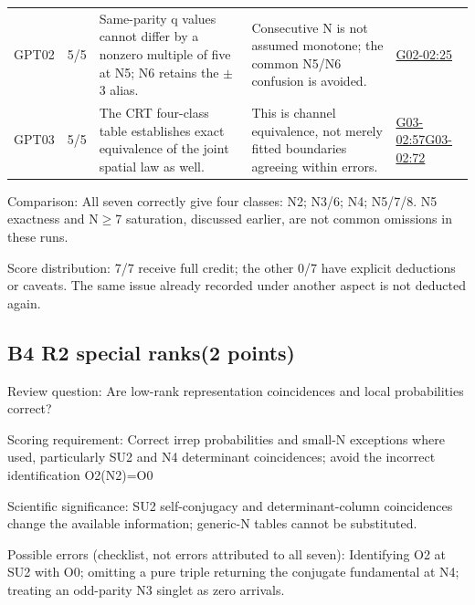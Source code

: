 \documentclass[11pt,a4paper]{article}
\begin{document}
{\begin{longtable}
{}GPT02 & 5/\allowbreak{}5 & Same-parity q values cannot differ by a nonzero multiple of five at N5; N6 retains the \ensuremath{\pm}3 alias. & Consecutive N is not assumed monotone; the common N5/\allowbreak{}N6 confusion is avoided. & \hyperref[src:G02-02]{G02-02:25}\tabularnewline
{}GPT03 & 5/\allowbreak{}5 & The CRT four-class table establishes exact equivalence of the joint spatial law as well. & This is channel equivalence,\allowbreak{} not merely fitted boundaries agreeing within errors. & \hyperref[src:G03-02]{G03-02:57}\newline \hyperref[src:G03-02]{G03-02:72}\tabularnewline
\bottomrule
\end{longtable}
}
Comparison: All seven correctly give four classes: N2; N3/\allowbreak{}6; N4; N5/\allowbreak{}7/\allowbreak{}8. N5 exactness and N\ensuremath{\geq}7 saturation,\allowbreak{} discussed earlier,\allowbreak{} are not common omissions in these runs.

Score distribution: 7/\allowbreak{}7 receive full credit; the other 0/\allowbreak{}7 have explicit deductions or caveats. The same issue already recorded under another aspect is not deducted again.

\clearpage
\subsection{B4 R2 special ranks(2 points)}
\label{aspect:B4}
Review question: Are low-rank representation coincidences and local probabilities correct?

Scoring requirement: Correct irrep probabilities and small-N exceptions where used,\allowbreak{} particularly SU2 and N4 determinant coincidences; avoid the incorrect identification O2(N2)=O0

Scientific significance: SU2 self-conjugacy and determinant-column coincidences change the available information; generic-N tables cannot be substituted.

Possible errors (checklist,\allowbreak{} not errors attributed to all seven): Identifying O2 at SU2 with O0; omitting a pure triple returning the conjugate fundamental at N4; treating an odd-parity N3 singlet as zero arrivals.
\end{document}
